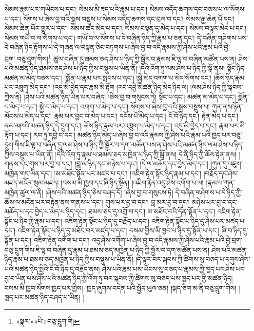 སེམས་རྣམ་པར་གཡེངས་པ་དང་། སེམས་མི་ཟད་པའི་རྣམ་པ་དང་། སེམས་འདོད་ཆགས་དང་བཅས་པ་ལ་སོགས་པ་དང་། སོགས་པ་ཞེས་བྱ་བའི་སྒྲས་བསྡུས་པ་སེམས་འདོད་ཆགས་དང་བྲལ་བ་དང་། སེམས་རྒྱ་ཆེན་པོ་དང་། སེམས་ཆེན་པོར་གྱུར་པ་དང་། སེམས་ཚད་མེད་པ་དང་། སེམས་བསྟན་དུ་མེད་པ་དང་། སེམས་བལྟར་མེད་པ་དང་། སེམས་གཡོ་བ་ལ་སོགས་པ་དང་། གཡོ་བ་ལ་སོགས་པ་དེ་བཞིན་ཉིད་ཀྱི་རྣམ་པ་ཅན་དང་། དེ་བཞིན་གཤེགས་པས་དེ་བཞིན་ཉིད་རྟོགས་པ་དེ་གཞན་ལ་བསྟན་ཅིང་བཏགས་པ་ཞེས་བྱ་བ་འདི་རྣམས་ཀྱི་ཤེས་པའི་རྣམ་པའི་བྱེ་བྲག་:བཅུ་དྲུག་གིས།\footnote{«སྣར་»«པེ་»བཅུ་དྲུག་གི།} ཚུལ་བཞིན་དུ་ཐམས་ཅད་ཤེས་པ་ཉིད་ཀྱི་སྦྱོར་བ་རྣམས་ཇི་ལྟ་བ་བཞིན་མཚོན་པས་ན། ཤེས་པའི་མཚན་ཉིད་ཐམས་ཅད་ཤེས་པ་ཉིད་ཀྱིས་བསྡུས་པ་ཡིན་ནོ། །དེའི་འོག་ཏུ་ལམ་ཤེས་པ་ཉིད་ཀྱི་སྒོ་ནས། སྟོང་ཉིད་མཚན་མ་མེད་བཅས་དང་། །སྨོན་པ་རྣམ་པར་སྤངས་པ་དང་། །སྐྱེ་མེད་འགག་པ་མེད་སོགས་དང་། །ཆོས་ཉིད་རྣམ་པར་འཁྲུག་མེད་དང་། །འདུ་མི་བྱེད་དང་རྣམ་མི་རྟོག །རབ་དབྱེ་མཚན་ཉིད་མེད་ཉིད་ལ། །ལམ་ཤེས་ཉིད་ཀྱི་སྐབས་ཀྱིས་ནི། །ཤེས་པའི་མཚན་ཉིད་ཡིན་པར་བཞེད། །ཅེས་བྱ་བ་གསུངས་ཏེ། སྟོང་པ་དང་། མཚན་མ་མེད་པ་དང་། སྨོན་པ་མེད་པ་དང་། སྐྱེ་བ་མེད་པ་དང་། འགག་པ་མེད་པ་དང་། སོགས་པ་ཞེས་བྱ་བའི་སྒྲས་བསྡུས་པ། ཀུན་ནས་ཉོན་མོངས་པ་མེད་པ་དང་། རྣམ་པར་བྱང་བ་མེད་པ་དང་། དངོས་པོ་མེད་པ་དང་། ངོ་བོ་ཉིད་དང་། རྟེན་མེད་པ་དང་། ནམ་མཁའི་མཚན་ཉིད་དེ་དྲུག་དང་། ཆོས་ཉིད་རྣམ་པར་འཁྲུག་པ་མེད་པ་དང་། འདུ་མི་བྱེད་པ་དང་། རྣམ་པར་མི་རྟོག་པ་དང་། རབ་ཏུ་དབྱེ་བ་དང་། མཚན་ཉིད་མེད་པ་ཞེས་བྱ་བ་འདི་རྣམས་ཀྱི་ཤེས་པའི་རྣམ་པའི་ཁྱད་པར་བཅུ་དྲུག་གིས་ཇི་ལྟ་བ་བཞིན་དུ་ལམ་ཤེས་པ་ཉིད་ཀྱི་སྦྱོར་བ་དག་མཚོན་པས་ན་ཤེས་པའི་མཚན་ཉིད་ལམ་ཤེས་པ་ཉིད་ཀྱིས་བསྡུས་པ་ཡིན་ནོ། །དེའི་འོག་ཏུ་རྣམ་པ་ཐམས་ཅད་མཁྱེན་པ་ཉིད་ཀྱི་སྒོ་ནས། དེ་ནི་ཉིད་ཀྱི་ཆོས་རྟེན་ནས། །གནས་དང་གུས་པར་བྱ་བ་དང་། །བླ་མ་ཉིད་དང་མཉེས་པ་དང་། །དེ་ལ་མཆོད་དང་བྱེད་མེད་དང་། །ཀུན་དུ་འཇུག་མཁྱེན་གང་ཡིན་དང་། །མ་མཐོང་སྟོན་པར་མཛད་པ་དང་། །འཇིག་རྟེན་སྟོང་ཉིད་རྣམ་པ་དང་། །བརྗོད་དང་ཤེས་མཛད་མངོན་སུམ་མཛད། །བསམ་མི་ཁྱབ་དང་ཞི་ཉིད་སྟོན། །འཇིག་རྟེན་འདུ་ཤེས་འགོག་པ་ལ། །རྣམ་པ་ཀུན་མཁྱེན་ཚུལ་ལ་ནི། །ཤེས་པའི་མཚན་ཉིད་ཅེས་བཤད་དོ། །ཞེས་བྱ་བ་གསུངས་ཏེ། དེ་བཞིན་གཤེགས་པ་དེ་ཉིད་ཀྱི་ཆོས་ལ་མངོན་པར་བརྟེན་ནས་གནས་པ་དང་། གུས་པར་བྱ་བ་དང་། བླ་མར་བྱ་བ་དང་། མཉེས་པར་བྱ་བ་དང་མཆོད་པ་དང་བྱེད་པ་མེད་པ་ཉིད་དང་། ཐམས་ཅད་དུ་འགྲོ་བ་དང་། མ་མཐོང་བའི་དོན་སྟོན་པ་དང་། འཇིག་རྟེན་སྟོང་པ་ཉིད་ཀྱི་རྣམ་པ་དང་། འཇིག་རྟེན་སྟོང་པ་ཉིད་དུ་བརྗོད་པ་དང་། འཇིག་རྟེན་སྟོང་པ་ཉིད་དུ་ཤེས་པར་མཛད་པ་དང་། འཇིག་རྟེན་སྟོང་པ་ཉིད་དུ་མཐོང་བར་མཛད་པ་དང་། བསམ་གྱིས་མི་ཁྱབ་པ་ཉིད་དུ་སྟོན་པ་དང་། ཞི་བ་ཉིད་དུ་སྟོན་པ་དང་། འཇིག་རྟེན་འགོག་པ་དང་། འདུ་ཤེས་འགོག་པ་ཞེས་བྱ་བ་འདི་རྣམས་ཀྱི་ཤེས་པའི་རྣམ་པའི་བྱེ་བྲག་བཅུ་དྲུག་གིས་ཇི་ལྟ་བ་བཞིན་དུ་རྣམ་པ་ཐམས་ཅད་མཁྱེན་པ་ཉིད་ཀྱི་སྦྱོར་བ་དག་མཚོན་པས་ན། ཤེས་པའི་མཚན་ཉིད་རྣམ་པ་ཐམས་ཅད་མཁྱེན་པ་ཉིད་ཀྱིས་བསྡུས་པ་ཡིན་ནོ། །དེ་ལྟར་བར་སྐབས་ཀྱི་ཚིགས་སུ་བཅད་པ་དགུས་ཤེས་པའི་མཚན་ཉིད་སྤྱིའི་ངོ་བོ་ཉིད་དུ་བརྗོད་ནས། ཤེས་པའི་རྣམ་པས་ཡོངས་སུ་བཅད་པ་རྣམས་ཀྱི་ཁྱད་པར་ཤེས་པར་བྱ་བ་ཡིན་པས་ཤེས་པའི་མཚན་ཉིད་ཀྱི་འོག་ཏུ་བར་སྐབས་ཀྱི་ཚིགས་སུ་བཅད་པས་ཁྱད་པར་གྱི་མཚན་ཉིད། བསམ་མི་ཁྱབ་སོགས་ཁྱད་པར་གྱིས། །ཁྱད་ཞུགས་བདེན་པའི་སྤྱོད་ཡུལ་ཅན། །སྐད་ཅིག་མ་ནི་བཅུ་དྲུག་གིས། །ཁྱད་པར་མཚན་ཉིད་བཤད་པ་ཡིན། །
